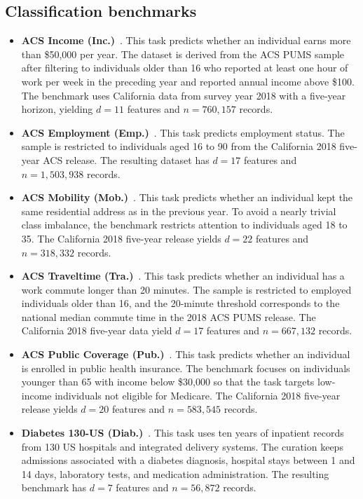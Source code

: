 \subsection{Classification benchmarks}
\begin{itemize}
  \item \textbf{ACS Income (Inc.)}~\citep{ding2021retiring}. This task predicts whether an individual earns more than \$50,000 per year. The dataset is derived from the ACS PUMS sample after filtering to individuals older than 16 who reported at least one hour of work per week in the preceding year and reported annual income above \$100. The benchmark uses California data from survey year 2018 with a five-year horizon, yielding \(d=11\) features and \(n=760{,}157\) records.
  \item \textbf{ACS Employment (Emp.)}~\citep{ding2021retiring}. This task predicts employment status. The sample is restricted to individuals aged 16 to 90 from the California 2018 five-year ACS release. The resulting dataset has \(d=17\) features and \(n=1{,}503{,}938\) records.
  \item \textbf{ACS Mobility (Mob.)}~\citep{ding2021retiring}. This task predicts whether an individual kept the same residential address as in the previous year. To avoid a nearly trivial class imbalance, the benchmark restricts attention to individuals aged 18 to 35. The California 2018 five-year release yields \(d=22\) features and \(n=318{,}332\) records.
  \item \textbf{ACS Traveltime (Tra.)}~\citep{ding2021retiring}. This task predicts whether an individual has a work commute longer than 20 minutes. The sample is restricted to employed individuals older than 16, and the 20-minute threshold corresponds to the national median commute time in the 2018 ACS PUMS release. The California 2018 five-year data yield \(d=17\) features and \(n=667{,}132\) records.
  \item \textbf{ACS Public Coverage (Pub.)}~\citep{ding2021retiring}. This task predicts whether an individual is enrolled in public health insurance. The benchmark focuses on individuals younger than 65 with income below \$30,000 so that the task targets low-income individuals not eligible for Medicare. The California 2018 five-year release yields \(d=20\) features and \(n=583{,}545\) records.
  \item \textbf{Diabetes 130-US (Diab.)}~\citep{strack2014impact}. This task uses ten years of inpatient records from 130 US hospitals and integrated delivery systems. The curation keeps admissions associated with a diabetes diagnosis, hospital stays between 1 and 14 days, laboratory tests, and medication administration. The resulting benchmark has \(d=7\) features and \(n=56{,}872\) records.
\end{itemize}

